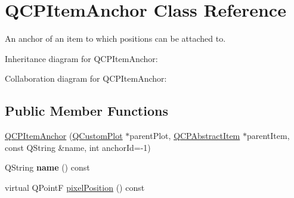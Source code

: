 \hypertarget{classQCPItemAnchor}{}\section{Q\+C\+P\+Item\+Anchor Class Reference}
\label{classQCPItemAnchor}


An anchor of an item to which positions can be attached to.  




Inheritance diagram for Q\+C\+P\+Item\+Anchor\+:


Collaboration diagram for Q\+C\+P\+Item\+Anchor\+:
\subsection*{Public Member Functions}
\begin{DoxyCompactItemize}
\item 
\hyperlink{classQCPItemAnchor_a32573023c6fa65b4496f1f995e5bfa5f}{Q\+C\+P\+Item\+Anchor} (\hyperlink{classQCustomPlot}{Q\+Custom\+Plot} $\ast$parent\+Plot, \hyperlink{classQCPAbstractItem}{Q\+C\+P\+Abstract\+Item} $\ast$parent\+Item, const Q\+String \&name, int anchor\+Id=-\/1)
\item 
Q\+String {\bfseries name} () const \hypertarget{classQCPItemAnchor_ac93984042a58c875e76847dc3e5f75fe}{}\label{classQCPItemAnchor_ac93984042a58c875e76847dc3e5f75fe}

\item 
virtual Q\+PointF \hyperlink{classQCPItemAnchor_a4e7e1764fcba37b532e833cb30fee4ee}{pixel\+Position} () const 
\end{DoxyCompactItemize}
